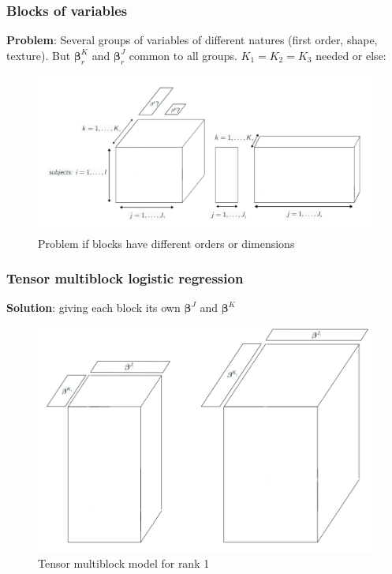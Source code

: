 \documentclass{beamer}
\begin{document}
\begin{frame}
 \frametitle{Blocks of variables}

 \textbf{Problem}: Several groups of variables of different natures (first order, shape, texture). But $\bm{\beta}_r^{K}$ and $\bm{\beta}_r^J$ common to all groups. $K_1 = K_2 = K_3$ needed or else:

 \begin{figure}
    \centering
    \includegraphics[scale = 0.23]{images/blocks_faux.png}
    \caption{Problem if blocks have different orders or dimensions}
\end{figure}

\end{frame}


\begin{frame}
    \frametitle{Tensor multiblock logistic regression}
    \vspace{10 pt}
    \textbf{Solution}: giving each block its own $\bm{\beta}^J$ and $\bm{\beta}^K$\\[15 pt]
    \begin{figure}
        \centering
        \includegraphics[scale = 0.28]{images/beta_blocks.png}
        \caption{Tensor multiblock model for rank 1}
    \end{figure}
\end{frame}
\end{document}
